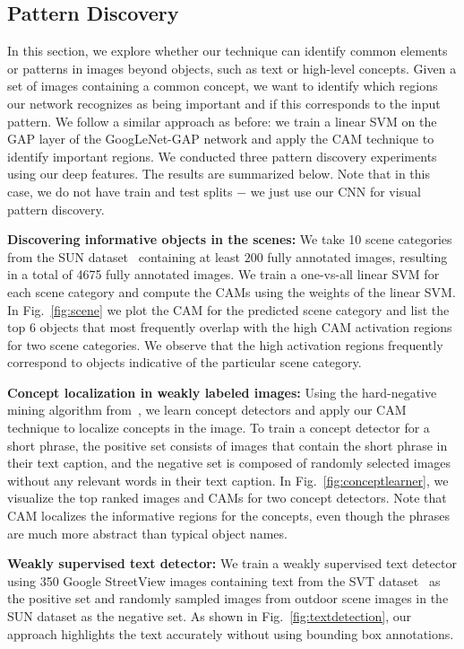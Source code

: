 \documentclass[10pt,twocolumn,letterpaper]{article}
\begin{document}
\subsection{Pattern Discovery}
\label{sec:pattern}

In this section, we explore whether our technique can identify common elements or patterns in images beyond objects, such as text or high-level concepts. Given a set of images containing a common concept, we want to identify which regions our network recognizes as being important and if this corresponds to the input pattern. We follow a similar approach as before: we train a linear SVM on the GAP layer of the GoogLeNet-GAP network and apply the CAM technique to identify important regions. We conducted three pattern discovery experiments using our deep features. The results are summarized below. Note that in this case, we do not have train and test splits $-$ we just use our CNN for visual pattern discovery.




\textbf{Discovering informative objects in the scenes:} We take 10 scene categories from the SUN dataset~\cite{xiao2010sun} containing at least $200$ fully annotated images, resulting in a total of 4675 fully annotated images. We train a one-vs-all linear SVM for each scene category and compute the CAMs using the weights of the linear SVM. In Fig.~\ref{fig:scene} we plot the CAM for the predicted scene category and list the top 6 objects that most frequently overlap with the high CAM activation regions for two scene categories. We observe that the high activation regions frequently correspond to objects indicative of the particular scene category.


\textbf{Concept localization in weakly labeled images:} Using the hard-negative mining algorithm from~\cite{zhou2014conceptlearner}, we learn concept detectors and apply our CAM technique to localize  concepts in the image. To train a concept detector for a short phrase, the positive set consists of  images that contain the short phrase in their text caption, and the negative set is composed of randomly selected images without any relevant words in their text caption. In Fig.~\ref{fig:conceptlearner}, we visualize the top ranked images and CAMs for two concept detectors. Note that CAM localizes the informative regions for the concepts, even though the phrases are much more abstract than typical object names.

\textbf{Weakly supervised text detector:} We train a weakly supervised text detector using 350 Google StreetView images containing text from the SVT dataset~\cite{wang2011end} as the positive set and randomly sampled images from outdoor scene images in the SUN dataset \cite{xiao2010sun} as the negative set. As shown in Fig.~\ref{fig:textdetection}, our approach highlights the text accurately without using bounding box annotations.
\end{document}

